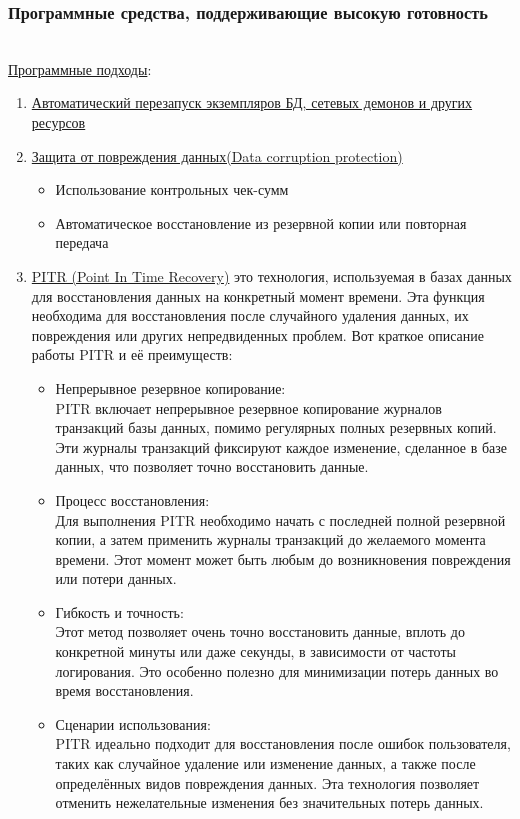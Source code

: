 \subsubsection{Программные средства, поддерживающие высокую готовность} ~\\
\underline{Программные подходы}:
\begin{enumerate}
    \item \underline{Автоматический перезапуск экземпляров БД, сетевых демонов и других ресурсов}
    \item \underline{Защита от повреждения данных(Data corruption protection)}
    \begin{itemize}
        \item Использование контрольных чек-сумм
        \item Автоматическое восстановление из резервной копии или повторная передача
    \end{itemize}
    \item \underline{PITR (Point In Time Recovery)} это технология, используемая в базах данных для восстановления данных на конкретный момент времени. Эта функция необходима для восстановления после случайного удаления данных, их повреждения или других непредвиденных проблем. Вот краткое описание работы PITR и её преимуществ:
    \begin{itemize}
        \item Непрерывное резервное копирование: \\
        PITR включает непрерывное резервное копирование журналов транзакций базы данных, помимо регулярных полных резервных копий. Эти журналы транзакций фиксируют каждое изменение, сделанное в базе данных, что позволяет точно восстановить данные.
        \item Процесс восстановления: \\
        Для выполнения PITR необходимо начать с последней полной резервной копии, а затем применить журналы транзакций до желаемого момента времени. Этот момент может быть любым до возникновения повреждения или потери данных.
        \item Гибкость и точность: \\
        Этот метод позволяет очень точно восстановить данные, вплоть до конкретной минуты или даже секунды, в зависимости от частоты логирования. Это особенно полезно для минимизации потерь данных во время восстановления.
        \item Сценарии использования: \\
        PITR идеально подходит для восстановления после ошибок пользователя, таких как случайное удаление или изменение данных, а также после определённых видов повреждения данных. Эта технология позволяет отменить нежелательные изменения без значительных потерь данных.

\end{itemize}
\end{enumerate}
